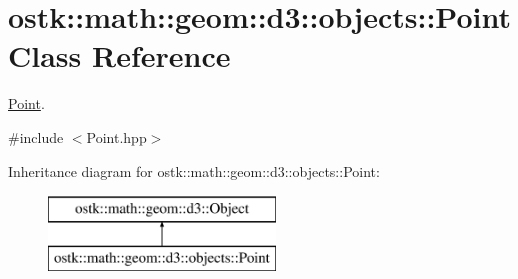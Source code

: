 \hypertarget{classostk_1_1math_1_1geom_1_1d3_1_1objects_1_1_point}{}\section{ostk\+:\+:math\+:\+:geom\+:\+:d3\+:\+:objects\+:\+:Point Class Reference}
\label{classostk_1_1math_1_1geom_1_1d3_1_1objects_1_1_point}


\hyperlink{classostk_1_1math_1_1geom_1_1d3_1_1objects_1_1_point}{Point}.  




{\ttfamily \#include $<$Point.\+hpp$>$}

Inheritance diagram for ostk\+:\+:math\+:\+:geom\+:\+:d3\+:\+:objects\+:\+:Point\+:\begin{figure}[H]
\begin{center}
\leavevmode
\includegraphics[height=2.000000cm]{classostk_1_1math_1_1geom_1_1d3_1_1objects_1_1_point}
\end{center}
\end{figure}
